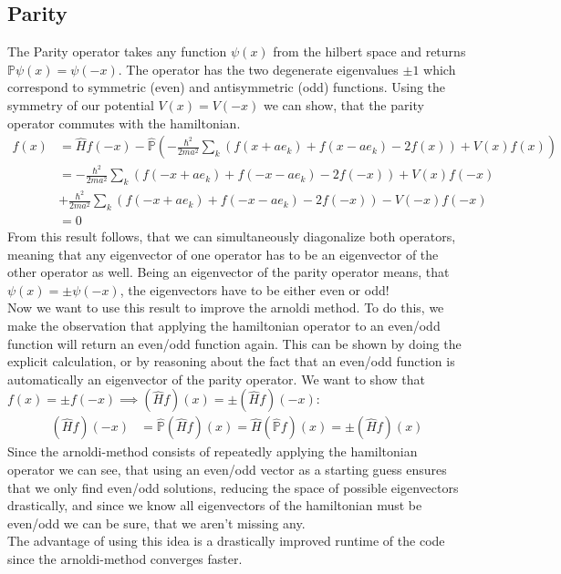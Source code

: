 \documentclass[11pt, letterpaper, onecolumn]{article}
\begin{document}
	\subsection{Parity}
 	The Parity operator takes any function $\psi(x)$ from the hilbert space and returns $\mathbb{P}\psi(x)=\psi(-x)$. The operator has the two degenerate eigenvalues $\pm1$ which correspond to symmetric (even) and antisymmetric (odd) functions. Using the symmetry of our potential $V(x)=V(-x)$ we can show, that the parity operator commutes with the hamiltonian.
  	\begin{align*}
		[\hat{H},\hat{\mathbb{P}}]f(x)&=\hat{H}f(-x)-\hat{\mathbb{P}}\left(-\frac{\hbar^2}{2ma^2}\sum\limits_k\left(f(x+ae_k)+f(x-ae_k)-2f(x)\right)+V(x)f(x) \right)\\
	    &=-\frac{\hbar^2}{2ma^2}\sum\limits_k\left(f(-x+ae_k)+f(-x-ae_k)-2f(-x)\right)+V(x)f(-x)\\&+\frac{\hbar^2}{2ma^2}\sum\limits_k\left(f(-x+ae_k)+f(-x-ae_k)-2f(-x)\right)-V(-x)f(-x)\\
	    &=0
	\end{align*}
 	From this result follows, that we can simultaneously diagonalize both operators, meaning that any eigenvector of one operator has to be an eigenvector of the other operator as well. Being an eigenvector of the parity operator means, that $\psi(x)=\pm\psi(-x)$, the eigenvectors have to be either even or odd!\\
	Now we want to use this result to improve the arnoldi method. To do this, we make the observation that applying the hamiltonian operator to an even/odd function will return an even/odd function again. This can be shown by doing the explicit calculation, or by reasoning about the fact that an even/odd function is automatically an eigenvector of the parity operator. We want to show that $f(x)=\pm f(-x)\implies (\hat{H}f)(x)=\pm(\hat{H}f)(-x)$:
 	\begin{align*}
    		(\hat{H}f)(-x)&=\hat{\mathbb{P}}(\hat{H}f)(x)=\hat{H}(\hat{\mathbb{P}}f)(x)=\pm(\hat{H}f)(x)
	\end{align*}
 	Since the arnoldi-method consists of repeatedly applying the hamiltonian operator we can see, that using an even/odd vector as a starting guess ensures that we only find even/odd solutions, reducing the space of possible eigenvectors drastically, and since we know all eigenvectors of the hamiltonian must be even/odd we can be sure, that we aren't missing any.\\
  	The advantage of using this idea is a drastically improved runtime of the code since the arnoldi-method converges faster.
\end{document}
